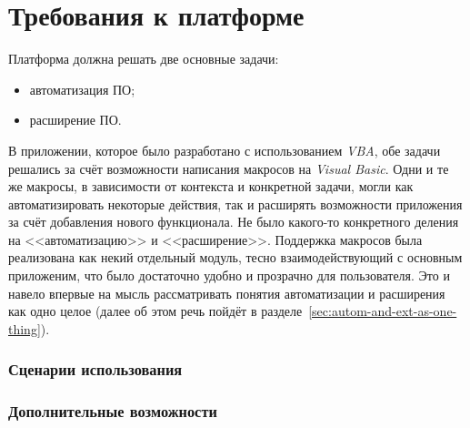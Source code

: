 \section{Требования к платформе}

Платформа должна решать две основные задачи:
\begin{itemize}
 \item автоматизация ПО;
 \item расширение ПО.
\end{itemize}

В приложении, которое было разработано с использованием {\it VBA}, обе задачи решались за счёт возможности написания макросов на {\it Visual Basic}. Одни и те же макросы, в зависимости от контекста и конкретной задачи, могли как автоматизировать некоторые действия, так и расширять возможности приложения за счёт добавления нового функционала. Не было какого-то конкретного деления на <<автоматизацию>> и <<расширение>>. Поддержка макросов была реализована как некий отдельный модуль, тесно взаимодействующий с основным приложеним, что было достаточно удобно и прозрачно для пользователя. Это и навело впервые на мысль рассматривать понятия автоматизации и расширения как одно целое (далее об этом речь пойдёт в разделе~\ref{sec:autom-and-ext-as-one-thing}).

\subsubsection{Сценарии использования}

\subsubsection{Дополнительные возможности}

\pagebreak
